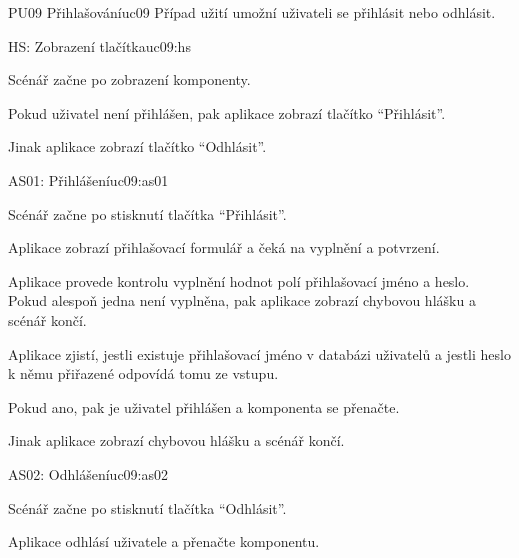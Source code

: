 \begin{usecase}{PU09 Přihlašování}{uc09}
    Případ užití umožní uživateli se přihlásit nebo odhlásit.

    \begin{scenario}{HS: Zobrazení tlačítka}{uc09:hs}
        \item Scénář začne po zobrazení komponenty.
        \item Pokud uživatel není přihlášen, pak aplikace zobrazí tlačítko \enquote{Přihlásit}.
        \item Jinak aplikace zobrazí tlačítko \enquote{Odhlásit}.
    \end{scenario}


    \begin{scenario}{AS01: Přihlášení}{uc09:as01}
        \item Scénář začne po stisknutí tlačítka \enquote{Přihlásit}.
        \item Aplikace zobrazí přihlašovací formulář a čeká na vyplnění a potvrzení.
        \item Aplikace provede kontrolu vyplnění hodnot polí přihlašovací jméno a heslo. Pokud alespoň jedna není vyplněna, pak aplikace zobrazí chybovou hlášku a scénář končí.
        \item Aplikace zjistí, jestli existuje přihlašovací jméno v databázi uživatelů a jestli heslo k němu přiřazené odpovídá tomu ze vstupu.
        \item Pokud ano, pak je uživatel přihlášen a komponenta se přenačte.
        \item Jinak aplikace zobrazí chybovou hlášku a scénář končí.
    \end{scenario}

    \begin{scenario}{AS02: Odhlášení}{uc09:as02}
        \item Scénář začne po stisknutí tlačítka \enquote{Odhlásit}.
        \item Aplikace odhlásí uživatele a přenačte komponentu.
    \end{scenario}
\end{usecase}